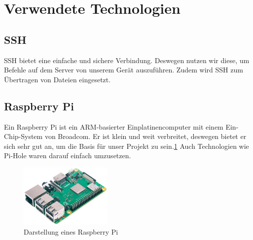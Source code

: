 \documentclass{article}
\begin{document}
\section{Verwendete Technologien}
\subsection{SSH}
SSH bietet eine einfache und sichere Verbindung. Deswegen nutzen wir diese, um Befehle auf dem Server von unserem Gerät auszuführen. Zudem wird SSH zum Übertragen von Dateien eingesetzt.

\subsection{Raspberry Pi}

Ein Raspberry Pi ist ein ARM-basierter Einplatinencomputer mit einem Ein-Chip-System von Broadcom. Er ist klein und weit verbreitet, deswegen bietet er sich sehr gut an, um die Basis für unser Projekt zu sein.\ref{fig:Raspberry} Auch Technologien wie Pi-Hole waren darauf einfach umzusetzen. 
\begin{figure}
    \centering
    \includegraphics[width=0.4\textwidth]{assets/RaspberryPi.png}
    \caption[\href{https://cdn-reichelt.de/bilder/web/xxl_ws/A300/RASPBERRY_PI_3B_PLUS_001.png}{Raspberry Pi Darstellung von Reichelt}]{\label{fig:Raspberry}Darstellung eines Raspberry Pi}
\end{figure}
\end{document}
